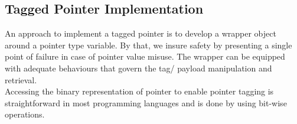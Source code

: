 \subsection{Tagged Pointer Implementation}

An approach to implement a tagged pointer is to develop a wrapper object around a pointer type variable. By that, we insure safety by presenting a single point of failure in case of pointer value misuse. The wrapper can be equipped with adequate behaviours that govern the tag/ payload manipulation and retrieval. \\

Accessing the binary representation of pointer to enable pointer tagging is straightforward in most programming languages and is done by using bit-wise operations. \\


\clearpage